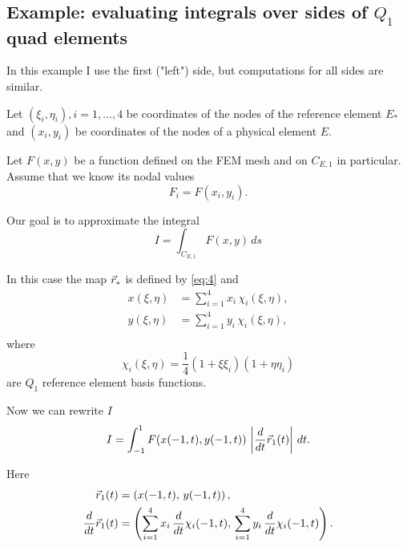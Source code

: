 \documentclass[11pt]{article}
\begin{document}
\subsection{Example: evaluating integrals over sides of $Q_{1}$ quad elements}
\label{sec-3-1}

In this example I use the first ("left") side, but computations for
all sides are similar.

Let $(\xi_{i}, \eta_{i}), i = 1,\dots,4$ be coordinates of the nodes
of the reference element $E_{*}$ and $(x_{i}, y_{i})$ be coordinates
of the nodes of a physical element $E$.

Let $F(x,y)$ be a function defined on the FEM mesh and on $C_{E,1}$ in
particular. Assume that we know its nodal values
\begin{equation}
\label{eq:7}
F_{i} = F(x_{i}, y_{i}).
\end{equation}

Our goal is to approximate the integral
\begin{equation}
\label{eq:8}
I = \int_{C_{E,1}} F(x,y)\, ds
\end{equation}

In this case the map $\vec r_{*}$ is defined by \eqref{eq:4} and
\begin{equation}
\label{eq:9}
\begin{aligned}
x(\xi,\eta) &= \sum_{i=1}^{4} x_{i}\, \chi_{i}(\xi, \eta),\\
y(\xi,\eta) &= \sum_{i=1}^{4} y_{i}\, \chi_{i}(\xi, \eta),\\
\end{aligned}
\end{equation}
where
\begin{equation}
\label{eq:10}
\chi_{i}(\xi,\eta) = \frac14 (1 + \xi\xi_{i})(1 + \eta\eta_{i})
\end{equation}
are $Q_{1}$ reference element basis functions.

Now we can rewrite $I$
\begin{equation}
\label{eq:11}
I = \int_{-1}^{1} F(x(-1, t), y(-1, t))\, \left|\frac{d}{dt}\vec r_{1}(t) \right|\, dt.
\end{equation}

Here
\begin{align}
\label{eq:12}
\vec r_{1}(t) &= \left( x(-1,t),\, y(-1,t) \right),\\
\frac{d}{dt} \vec r_{1}(t) &= \left( \sum_{i=1}^{4} x_{i}\, \frac{d}{dt}\chi_{i}(-1, t),\,
                                 \sum_{i=1}^{4} y_{i}\, \frac{d}{dt}\chi_{i}(-1, t)  \right).
\end{align}
\end{document}
